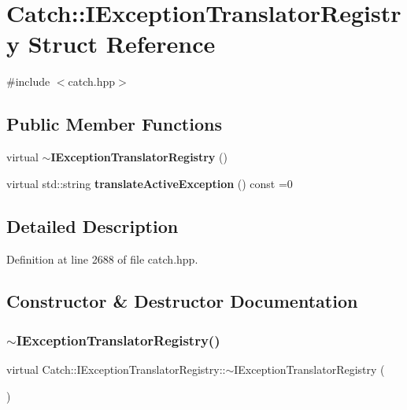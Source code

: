 \section{Catch\+::I\+Exception\+Translator\+Registry Struct Reference}
\label{struct_catch_1_1_i_exception_translator_registry}


{\ttfamily \#include $<$catch.\+hpp$>$}

\subsection*{Public Member Functions}
\begin{DoxyCompactItemize}
\item 
virtual \textbf{ $\sim$\+I\+Exception\+Translator\+Registry} ()
\item 
virtual std\+::string \textbf{ translate\+Active\+Exception} () const =0
\end{DoxyCompactItemize}


\subsection{Detailed Description}


Definition at line 2688 of file catch.\+hpp.



\subsection{Constructor \& Destructor Documentation}
\mbox{\label{struct_catch_1_1_i_exception_translator_registry_acf7402e18789ea46d54ea8564ac358d3}} 
\subsubsection{$\sim$IExceptionTranslatorRegistry()}
{\footnotesize\ttfamily virtual Catch\+::\+I\+Exception\+Translator\+Registry\+::$\sim$\+I\+Exception\+Translator\+Registry (\begin{DoxyParamCaption}{ }\end{DoxyParamCaption})\hspace{0.3cm}{\ttfamily [virtual]}}



